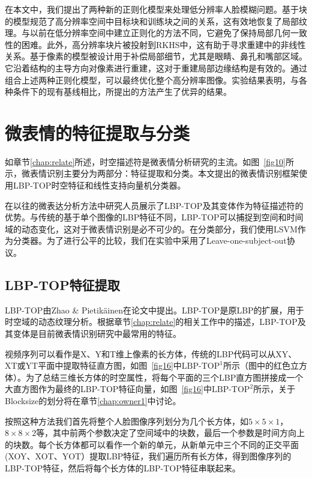 在本文中，我们提出了两种新的正则化模型来处理低分辨率人脸模糊问题。基于块的模型规范了高分辨率空间中目标块和训练块之间的关系，这有效地恢复了局部纹理。与以前在低分辨率空间中建立正则化的方法不同，它避免了保持局部几何一致性的困难。此外，高分辨率块片被投射到RKHS中，这有助于寻求重建中的非线性关系。基于像素的模型被设计用于补偿局部细节，尤其是眼睛、鼻孔和嘴部区域。它沿着结构的主导方向对像素进行重建，这对于重建局部边缘结构是有效的。通过组合上述两种正则化模型，可以最终优化整个高分辨率图像。实验结果表明，与各种条件下的现有基线相比，所提出的方法产生了优异的结果。

\section{微表情的特征提取与分类}

如章节\ref{chap:relate}所述，时空描述符是微表情分析研究的主流。如图~\ref{fig10}所示，微表情识别主要分为两部分：特征提取和分类。本文提出的微表情识别框架使用LBP-TOP时空特征和线性支持向量机分类器。

在以往的微表达分析方法中研究人员展示了LBP-TOP及其变体作为特征描述符的优势。与传统的基于单个图像的LBP特征不同，LBP-TOP可以捕捉到空间和时间域的动态变化，这对于微表情识别是必不可少的。在分类部分，我们使用LSVM作为分类器。为了进行公平的比较，我们在实验中采用了Leave-one-subject-out协议。

\subsection{LBP-TOP特征提取}

LBP-TOP由Zhao \& Pietik{\"a}inen在论文中提出。LBP-TOP是原LBP的扩展，用于时空域的动态纹理分析。根据章节\ref{chap:relate}的相关工作中的描述，LBP-TOP及其变体是目前微表情识别研究中最常用的特征。

视频序列可以看作是X、Y和T维上像素的长方体，传统的LBP代码可以从XY、XT或YT平面中提取特征直方图，如图~\ref{fig16}中$\textrm{LBP-TOP}^{1}$所示（图中的红色立方体）。为了总结三维长方体的时空属性，将每个平面的三个LBP直方图拼接成一个大直方图作为最终的LBP-TOP特征向量，如图~\ref{fig16}中$\textrm{LBP-TOP}^{2}$所示，关于Blocksize的划分将在章节\ref{chap:owner1}中讨论。

按照这种方法我们首先将整个人脸图像序列划分为几个长方体，如$ 5\times5\times1 $，$ 8\times8\times2 $等，其中前两个参数决定了空间域中的块数，最后一个参数是时间方向上的块数。每个长方体都可以看作一个新的单元，从新单元中三个不同的正交平面(XOY、XOT、YOT）提取LBP特征，我们遍历所有长方体，得到图像序列的LBP-TOP特征，然后将每个长方体的LBP-TOP特征串联起来。

